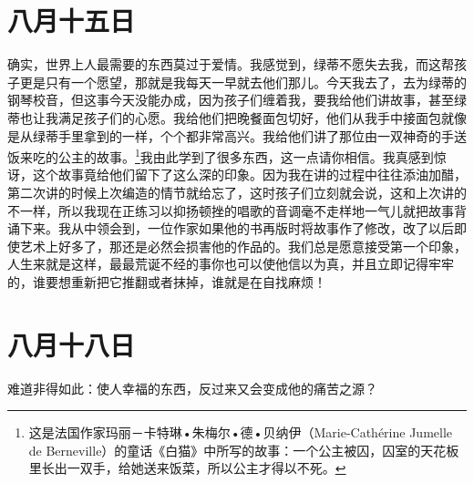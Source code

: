 \documentclass[12pt,oneside]{book}
\begin{document}
\chapter{八月十五日}
\label{sec-2-33}
确实，世界上人最需要的东西莫过于爱情。我感觉到，绿蒂不愿失去我，而这帮孩子更是只有一个愿望，那就是我每天一早就去他们那儿。今天我去了，去为绿蒂的钢琴校音，但这事今天没能办成，因为孩子们缠着我，要我给他们讲故事，甚至绿蒂也让我满足孩子们的心愿。我给他们把晚餐面包切好，他们从我手中接面包就像是从绿蒂手里拿到的一样，个个都非常高兴。我给他们讲了那位由一双神奇的手送饭来吃的公主的故事。\footnote{这是法国作家玛丽－卡特琳•朱梅尔•德•贝纳伊（Marie-Cathérine Jumelle de Berneville）的童话《白猫》中所写的故事：一个公主被囚，囚室的天花板里长出一双手，给她送来饭菜，所以公主才得以不死。}我由此学到了很多东西，这一点请你相信。我真感到惊讶，这个故事竟给他们留下了这么深的印象。因为我在讲的过程中往往添油加醋，第二次讲的时候上次编造的情节就给忘了，这时孩子们立刻就会说，这和上次讲的不一样，所以我现在正练习以抑扬顿挫的唱歌的音调毫不走样地一气儿就把故事背诵下来。我从中领会到，一位作家如果他的书再版时将故事作了修改，改了以后即使艺术上好多了，那还是必然会损害他的作品的。我们总是愿意接受第一个印象，人生来就是这样，最最荒诞不经的事你也可以使他信以为真，并且立即记得牢牢的，谁要想重新把它推翻或者抹掉，谁就是在自找麻烦！


\chapter{八月十八日}
\label{sec-2-34}
难道非得如此：使人幸福的东西，反过来又会变成他的痛苦之源？
\end{document}
